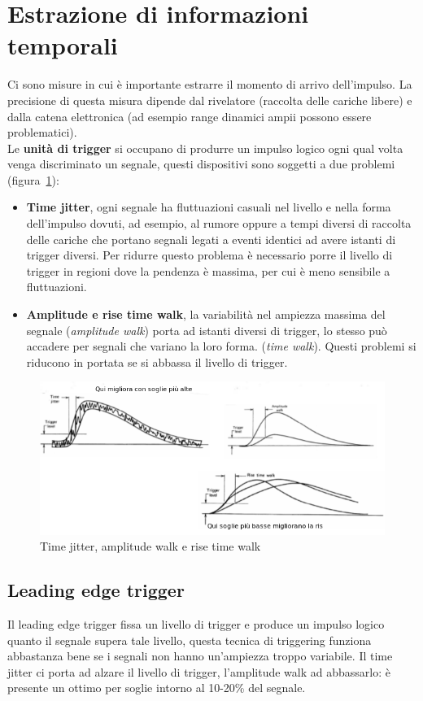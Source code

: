 \section{Estrazione di informazioni temporali}
Ci sono misure in cui \`e importante estrarre il momento di arrivo dell'impulso.
La precisione di questa misura dipende dal rivelatore (raccolta delle cariche libere) e dalla catena elettronica (ad esempio range dinamici ampii possono essere problematici).\\
Le \textbf{unit\`a di trigger} si occupano di produrre un impulso logico ogni qual volta venga discriminato un segnale, questi dispositivi sono soggetti a due problemi (figura~\ref{fig:timeJitter}):
\begin{itemize}
\item \textbf{Time jitter}, ogni segnale ha fluttuazioni casuali nel livello e nella forma dell'impulso dovuti, ad esempio, al rumore oppure a tempi diversi di raccolta delle cariche
che portano segnali legati a eventi identici ad avere istanti di trigger diversi. 
Per ridurre questo problema \`e necessario porre il livello di trigger in regioni dove la pendenza \`e massima, per cui \`e meno sensibile a fluttuazioni.
\item \textbf{Amplitude e rise time walk}, la variabilit\`a nel ampiezza massima del segnale (\textit{amplitude walk}) porta ad istanti diversi di trigger,
lo stesso pu\`o accadere per segnali che variano la loro forma. (\textit{time walk}).
Questi problemi si riducono in portata se si abbassa il livello di trigger.
\end{itemize}
\begin{figure}[htbp]
\begin{center}
\includegraphics[scale=0.70]{./Immagini/TimeJitter.png}
\caption{Time jitter, amplitude walk e rise time walk}
\label{fig:timeJitter}
\end{center}
\end{figure}
\subsection{Leading edge trigger}
Il leading edge trigger fissa un livello di trigger e produce un impulso logico quanto il segnale supera tale livello, questa tecnica di triggering funziona abbastanza bene se i segnali non hanno un'ampiezza troppo variabile.
Il time jitter ci porta ad alzare il livello di trigger, l'amplitude walk ad abbassarlo: \`e presente un ottimo per soglie intorno al 10-20\% del segnale.

